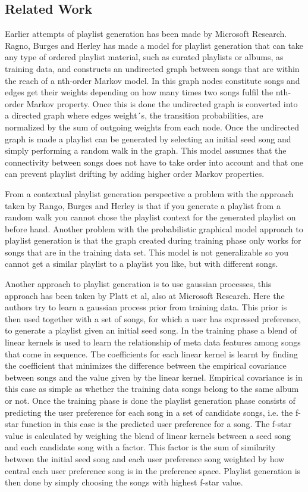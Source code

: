 \documentclass[a4paper,11pt]{kth-mag}
\begin{document}
\subsection{Related Work}
Earlier attempts of playlist generation has been made by Microsoft Research. Ragno, Burges and Herley has made a model for playlist generation that can take any type of ordered playlist material, such as curated playlists or albums, as training data, and constructs an undirected graph between songs that are within the reach of a nth-order Markov model. In this graph nodes constitute songs and edges get their weights depending on how many times two songs fulfil the nth-order Markov property. Once this is done the undirected graph is converted into a directed graph where edges weight´s, the transition probabilities, are normalized by the sum of outgoing weights from each node. Once the undirected graph is made a playlist can be generated by selecting an initial seed song and simply performing a random walk in the graph. This model assumes that the connectivity between songs does not have to take order into account and that one can prevent playlist drifting by adding higher order Markov properties. 

From a contextual playlist generation perspective a problem with the approach taken by Rango, Burges and Herley is that if you generate a playlist from a random walk you cannot chose the playlist context for the generated playlist on before hand. Another problem with the probabilistic graphical model approach to playlist generation is that the graph created during training phase only works for songs that are in the training data set. This model is not generalizable so you cannot get a similar playlist to a playlist you like, but with different songs.

Another approach to playlist generation is to use gaussian processes, this approach has been taken by Platt et al, also at Microsoft Research. Here the authors try to learn a gaussian process prior from training data. This prior is then used together with a set of songs, for which a user has expressed preference, to generate a playlist given an initial seed song. In the training phase a blend of linear kernels is used to learn the relationship of meta data features among songs that come in sequence. The coefficients for each linear kernel is learnt by finding the coefficient that minimizes the difference between the empirical covariance between songs and the value given by the linear kernel. Empirical covariance is in this case as simple as whether the training data songs belong to the same album or not. Once the training phase is done the playlist generation phase consists of predicting the user preference for each song in a set of candidate songs, i.e. the f-star function in this case is the predicted user preference for a song. The f-star value is calculated by weighing the blend of linear kernels between a seed song and each candidate song with a factor. This factor is the sum of similarity between the initial seed song and each user preference song weighted by how central each user preference song is in the preference space. Playlist generation is then done by simply choosing the songs with highest f-star value.
\end{document}
